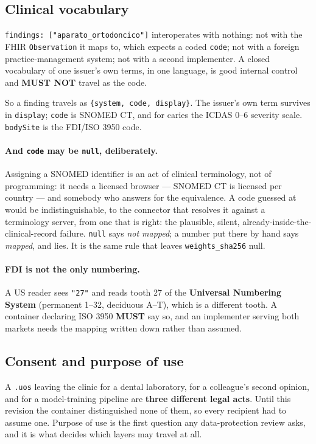\documentclass[11pt,a4paper]{article}
\newcommand{\MUST}{\textcolor{uosred}{\textbf{MUST}}}
\newcommand{\MUSTNOT}{\textcolor{uosred}{\textbf{MUST NOT}}}
\newcommand{\code}[1]{\texttt{\small #1}}
\begin{document}
\subsection{Clinical vocabulary}\label{sec:vocab}

\code{findings: ["aparato\_ortodoncico"]} interoperates with nothing: not with the FHIR
\code{Observation} it maps to, which expects a coded \code{code}; not with a foreign
practice-management system; not with a second implementer. A closed vocabulary of one
issuer's own terms, in one language, is good internal control and \MUSTNOT{} travel as the
code.

So a finding travels as \code{\{system, code, display\}}. The issuer's own term survives in
\code{display}; \code{code} is SNOMED CT, and for caries the ICDAS 0--6 severity scale.
\code{bodySite} is the FDI/ISO 3950 code.

\paragraph{And \code{code} may be \code{null}, deliberately.}
Assigning a SNOMED identifier is an act of clinical terminology, not of programming: it
needs a licensed browser --- SNOMED CT is licensed per country --- and somebody who answers
for the equivalence. A code guessed at would be indistinguishable, to the connector that
resolves it against a terminology server, from one that is right: the plausible, silent,
already-inside-the-clinical-record failure. \code{null} says \emph{not mapped}; a number
put there by hand says \emph{mapped}, and lies. It is the same rule that leaves
\code{weights\_sha256} null.

\paragraph{FDI is not the only numbering.}
A US reader sees \code{"27"} and reads tooth 27 of the \textbf{Universal Numbering System}
(permanent 1--32, deciduous A--T), which is a different tooth. A container declaring ISO
3950 \MUST{} say so, and an implementer serving both markets needs the mapping written
down rather than assumed.

\subsection{Consent and purpose of use}\label{sec:consent}

A \code{.uos} leaving the clinic for a dental laboratory, for a colleague's second opinion,
and for a model-training pipeline are \textbf{three different legal acts}. Until this
revision the container distinguished none of them, so every recipient had to assume one.
Purpose of use is the first question any data-protection review asks, and it is what
decides which layers may travel at all.
\end{document}
